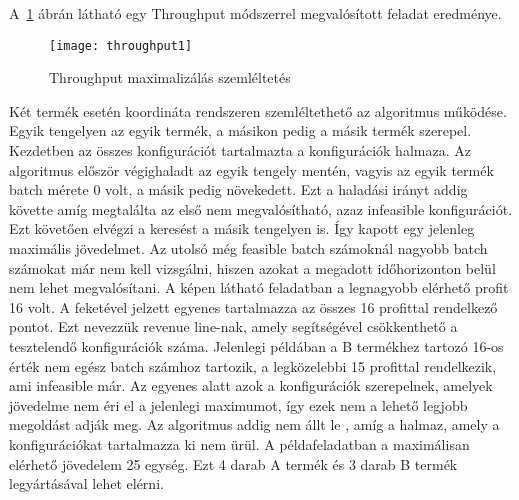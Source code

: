 A~\ref{throughput1} ábrán látható egy Throughput módszerrel megvalósított feladat eredménye.
\begin{figure}[H]
\begin{center}
\texttt{[image: throughput1]}
\caption{Throughput maximalizálás szemléltetés}
\label{throughput1}
\end{center}
\end{figure}
Két termék esetén koordináta rendszeren szemléltethető az algoritmus működése. Egyik tengelyen az egyik termék, a másikon pedig a másik termék szerepel. Kezdetben az összes konfigurációt tartalmazta a konfigurációk halmaza. Az algoritmus először végighaladt az egyik tengely mentén, vagyis az egyik termék batch mérete 0 volt, a másik pedig növekedett. Ezt a haladási irányt addig követte amíg megtalálta az első nem megvalósítható, azaz infeasible konfigurációt. Ezt követően elvégzi a keresést a másik tengelyen is. Így kapott egy jelenleg maximális jövedelmet. Az utolsó még feasible batch számoknál nagyobb batch számokat már nem kell vizsgálni, hiszen azokat a megadott időhorizonton belül nem lehet megvalósítani. A képen látható feladatban a legnagyobb elérhető profit 16 volt. A feketével jelzett egyenes tartalmazza az összes 16 profittal rendelkező pontot. Ezt nevezzük revenue line-nak, amely segítségével csökkenthető a tesztelendő konfigurációk száma. Jelenlegi példában a B termékhez tartozó 16-os érték nem egész batch számhoz tartozik, a legközelebbi 15 profittal rendelkezik, ami infeasible már. Az egyenes alatt azok a konfigurációk szerepelnek, amelyek jövedelme nem éri el a jelenlegi maximumot, így ezek nem a lehető legjobb megoldást adják meg. Az algoritmus addig nem állt le , amíg a halmaz, amely a konfigurációkat tartalmazza ki nem ürül. A példafeladatban a maximálisan elérhető jövedelem 25 egység. Ezt 4 darab A termék és 3 darab B termék legyártásával lehet elérni.